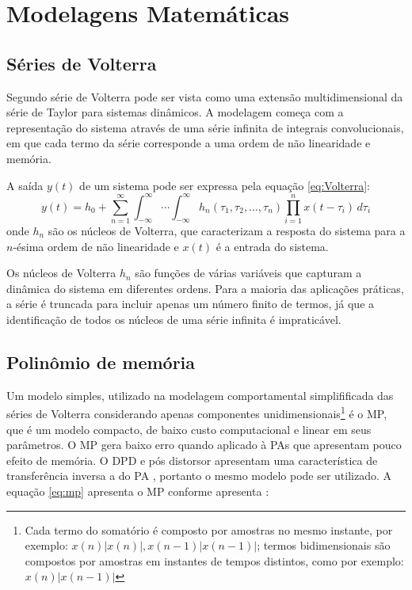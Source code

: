 \section{Modelagens Matemáticas}

\subsection*{Séries de Volterra}
Segundo \cite{Gonçalves2009} série de Volterra pode ser vista como uma extensão multidimensional da série de Taylor para sistemas dinâmicos. A modelagem começa com a representação do sistema através de uma série infinita de integrais convolucionais, em que cada termo da série corresponde a uma ordem de não linearidade e memória.

A saída \( y(t) \) de um sistema pode ser expressa pela equação \ref{eq:Volterra}: \begin{equation}
    y(t) = h_0 + \sum_{n=1}^{\infty} \int_{-\infty}^{\infty} \cdots \int_{-\infty}^{\infty} h_n(\tau_1, \tau_2, \ldots, \tau_n) \prod_{i=1}^{n} x(t - \tau_i) \, d\tau_i
    \label{eq:Volterra}
\end{equation} onde \( h_n \) são os núcleos de Volterra, que caracterizam a resposta do sistema para a \( n \)-ésima ordem de não linearidade e \( x(t) \) é a entrada do sistema.

Os núcleos de Volterra \( h_n \) são funções de várias variáveis que capturam a dinâmica do sistema em diferentes ordens. Para a maioria das aplicações práticas, a série é truncada para incluir apenas um número finito de termos, já que a identificação de todos os núcleos de uma série infinita é impraticável.

\subsection*{Polinômio de memória}\label{sub:polimem}

Um modelo simples, utilizado na modelagem comportamental simpliﬁficada das séries de Volterra considerando apenas componentes unidimensionais\footnote{Cada termo do somatório é composto por amostras no mesmo instante, por exemplo: $x(n)|x(n)|,x(n - 1)|x(n - 1)|$; termos bidimensionais são compostos por amostras em instantes de tempos distintos, como por exemplo: $x(n)|x(n - 1)|$} é o MP, que é um modelo compacto, de baixo custo computacional e linear em seus parâmetros. O MP gera baixo erro quando aplicado à PAs que apresentam pouco efeito de memória. O DPD e pós distorsor apresentam uma característica de transferência inversa a do PA \cite{Schuartz2017}, portanto o mesmo modelo pode ser utilizado. A equação \ref{eq:mp} apresenta o MP conforme apresenta \cite{Schuartz2017}: 

